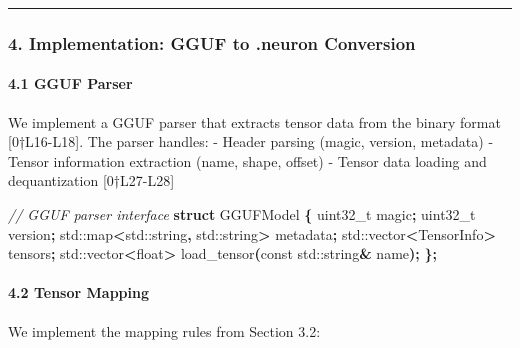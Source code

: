 \documentclass[
  11pt,
  a4paper,
]{article}
\newenvironment{Shaded}{\begin{snugshade}}{\end{snugshade}}
\newcommand{\AttributeTok}[1]{\textcolor[rgb]{0.13,0.29,0.53}{#1}}
\newcommand{\BuiltInTok}[1]{#1}
\newcommand{\CommentTok}[1]{\textcolor[rgb]{0.56,0.35,0.01}{\textit{#1}}}
\newcommand{\DataTypeTok}[1]{\textcolor[rgb]{0.13,0.29,0.53}{#1}}
\newcommand{\KeywordTok}[1]{\textcolor[rgb]{0.13,0.29,0.53}{\textbf{#1}}}
\newcommand{\NormalTok}[1]{#1}
\newcommand{\OperatorTok}[1]{\textcolor[rgb]{0.81,0.36,0.00}{\textbf{#1}}}
\begin{document}
\begin{center}\rule{0.5\linewidth}{0.5pt}\end{center}

\subsubsection{4. Implementation: GGUF to .neuron
Conversion}\label{implementation-gguf-to-.neuron-conversion}

\paragraph{4.1 GGUF Parser}\label{gguf-parser}

We implement a GGUF parser that extracts tensor data from the binary
format {[}0†L16-L18{]}. The parser handles: - Header parsing (magic,
version, metadata) - Tensor information extraction (name, shape, offset)
- Tensor data loading and dequantization {[}0†L27-L28{]}

\begin{Shaded}
\begin{Highlighting}[]
\CommentTok{// GGUF parser interface}
\KeywordTok{struct}\NormalTok{ GGUFModel }\OperatorTok{\{}
    \DataTypeTok{uint32\_t}\NormalTok{ magic}\OperatorTok{;}
    \DataTypeTok{uint32\_t}\NormalTok{ version}\OperatorTok{;}
    \BuiltInTok{std::}\NormalTok{map}\OperatorTok{\textless{}}\BuiltInTok{std::}\NormalTok{string}\OperatorTok{,} \BuiltInTok{std::}\NormalTok{string}\OperatorTok{\textgreater{}}\NormalTok{ metadata}\OperatorTok{;}
    \BuiltInTok{std::}\NormalTok{vector}\OperatorTok{\textless{}}\NormalTok{TensorInfo}\OperatorTok{\textgreater{}}\NormalTok{ tensors}\OperatorTok{;}
    \BuiltInTok{std::}\NormalTok{vector}\OperatorTok{\textless{}}\DataTypeTok{float}\OperatorTok{\textgreater{}}\NormalTok{ load\_tensor}\OperatorTok{(}\AttributeTok{const} \BuiltInTok{std::}\NormalTok{string}\OperatorTok{\&}\NormalTok{ name}\OperatorTok{);}
\OperatorTok{\};}
\end{Highlighting}
\end{Shaded}

\paragraph{4.2 Tensor Mapping}\label{tensor-mapping}

We implement the mapping rules from Section 3.2:
\end{document}
